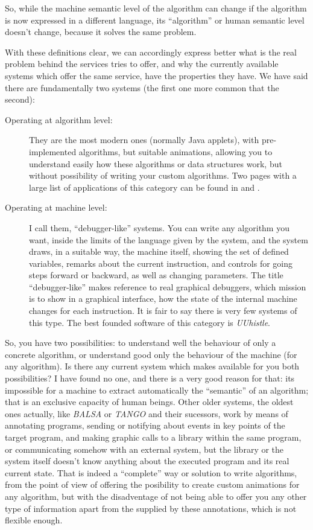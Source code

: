 \documentclass{article}
\begin{document}
So, while the machine semantic level of the algorithm can change if the
algorithm is now expressed in a different language, its ``algorithm'' or human
semantic level doesn't change, because it solves the same problem.

With these definitions clear, we can accordingly express better what is the real
problem behind the services \fav tries to offer, and why the currently available
systems which offer the same service, have the properties they have. We have said
there are fundamentally two systems (the first one more common that the second):

\begin{description}
  \item[Operating at algorithm level:] They are the most modern ones (normally
    Java applets), with pre-implemented algorithms, but suitable animations,
    allowing you to understand easily how these algorithms or data structures
    work, but without possibility of writing your custom algorithms. Two pages
    with a large list of applications of this category can be found in
    \cite{inaction} and \cite{galles}.
  \item[Operating at machine level:] I call them, ``debugger-like'' systems. You
    can write any algorithm you want, inside the limits of the language given by
    the system, and the system draws, in a suitable way, the machine itself,
    showing the set of defined variables, remarks about the current instruction,
    and controls for going steps forward or backward, as well as changing
    parameters. The title ``debugger-like'' makes reference to real graphical
    debuggers, which mission is to show in a graphical interface, how the state
    of the internal machine changes for each instruction. It is fair to say
    there is very few systems of this type. The best founded software of this
    category is \textit{UUhistle}\cite{uuhistle}.
\end{description}

So, you have two possibilities: to understand well the behaviour of only a
concrete algorithm, or understand good only the behaviour of the machine (for
any algorithm). Is there any current system which makes available for you both
possibilities? I have found no one, and there is a very good reason for that:
its impossible for a machine to extract automatically the ``semantic'' of an
algorithm; that is an exclusive capacity of human beings. Other older systems,
the oldest ones actually, like \textit{BALSA}\cite{balsa} or
\textit{TANGO}\cite{tango} and their sucessors, work by means of annotating
programs, sending or notifying about events in key points of the target program,
and making graphic calls to a library within the same program, or communicating
somehow with an external system, but the library or the system itself doesn't
know anything about the executed program and its real current state. That is
indeed a ``complete'' way or solution to write algorithms, from the point of
view of offering the posibility to create custom animations for any algorithm,
but with the disadventage of not being able to offer you any other type of
information apart from the supplied by these annotations, which is not flexible
enough.
\end{document}
